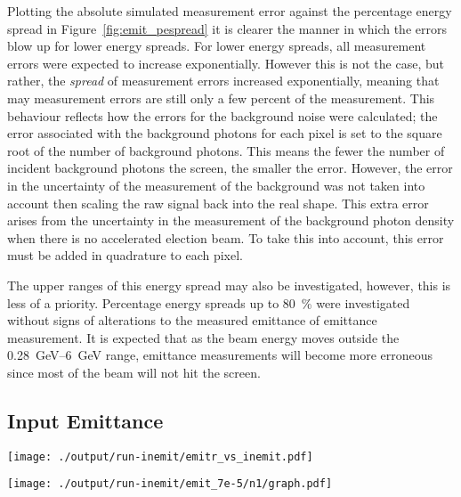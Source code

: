 Plotting the absolute simulated measurement error against the percentage energy
spread in Figure~\ref{fig:emit_pespread} it is clearer the manner in which the
errors blow up for lower energy spreads. 
For lower energy spreads, all measurement errors were expected to increase
exponentially.  However this is not the case, but rather, the \emph{spread} of
measurement errors increased exponentially, meaning that may measurement errors
are still only a few percent of the measurement. This behaviour reflects how the
errors for the background noise were calculated; the error associated with the
background photons for each pixel is set to the square root of the number of
background photons. This means the fewer the number of incident background
photons the screen, the smaller the error. However, the error in the uncertainty
of the measurement of the background was not taken into account then scaling the
raw signal back into the real shape. This extra error arises from the
uncertainty in the measurement of the background photon density when there is no
accelerated election beam. To take this into account, this error must be added
in quadrature to each pixel.

The upper ranges of this energy spread may also be investigated, however, this
is less of a priority. Percentage energy spreads up to \SI{80}{\percent} were
investigated without signs of alterations to the measured emittance of emittance
measurement. It is expected that as the beam energy moves outside the
\SIrange{0.28}{6}{\giga\electronvolt} range, emittance measurements will become
more erroneous since most of the beam will not hit the screen.

\subsection{Input Emittance}

\begin{figure*}[!t]
	\begin{minipage}[t]{\columnwidth}
		\centering
		\texttt{[image: ./output/run-inemit/emitr\_vs\_inemit.pdf]}
		\caption{
			Plot of the ratio between the measured and true emittances of the beam
			against the true emittance of the beam.
			The blue line is the expected measurement value when taking into account
			the systematic overestimation due to discrete bins.
		}
		\label{fig:emitr_inemit}
	\end{minipage}\hfill
	\begin{minipage}[t]{\columnwidth}
		\centering
		\texttt{[image: ./output/run-inemit/emit\_7e-5/n1/graph.pdf]}
		\caption{
			Beam reconstruction for a large beam emittance of
			\SI{7e-5}{\meter\radian} showing the underestimation of the measured
			vertical beam sizes.
		}
		\label{fig:large_emit}
	\end{minipage}
\end{figure*}


